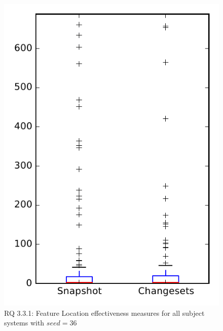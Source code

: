 
\begin{figure}
\centering
\includegraphics[height=0.4\textheight]{figures/flt_seed/rq1_overview_36}
\caption{RQ 3.3.1: Feature Location effectiveness measures for all subject systems with $seed=36$}
\label{fig:flt_seed:rq1:overview}
\end{figure}
